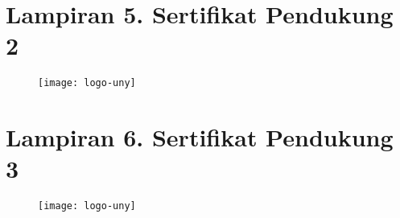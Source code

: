 \newpage

\section*{Lampiran 5. Sertifikat Pendukung 2}
\begin{figure}[H]
	\centering
	\texttt{[image: logo-uny]}
\end{figure}

\newpage

\section*{Lampiran 6. Sertifikat Pendukung 3}
\begin{figure}[H]
	\centering
	\texttt{[image: logo-uny]}
\end{figure}

\newpage

